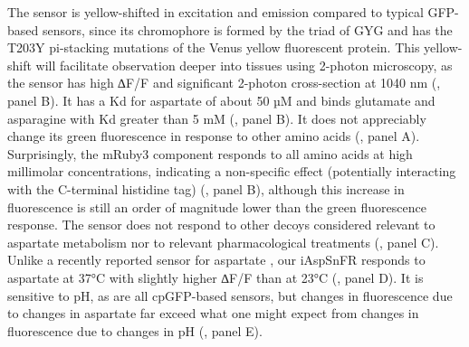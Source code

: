 \documentclass[9pt,lineno]{elife}
\begin{document}
The sensor is yellow-shifted in excitation and emission compared to typical GFP-based sensors, since its chromophore is formed by the triad of GYG and has the T203Y pi-stacking mutations of the Venus yellow fluorescent protein.
This yellow-shift will facilitate observation deeper into tissues using 2-photon microscopy, as the sensor has high ∆F/F and significant 2-photon cross-section at 1040 nm (, panel B).
It has a Kd for aspartate of about 50 µM and binds glutamate and asparagine with Kd greater than 5 mM (, panel B).
It does not appreciably change its green fluorescence in response to other amino acids (, panel A).
Surprisingly, the mRuby3 component responds to all amino acids at high millimolar concentrations, indicating a non-specific effect (potentially interacting with the C-terminal histidine tag) (, panel B), although this increase in fluorescence is still an order of magnitude lower than the green fluorescence response.
The sensor does not respond to other decoys considered relevant to aspartate metabolism nor to relevant pharmacological treatments (, panel C).
Unlike a recently reported sensor for aspartate \citep{Hellweg2023}, our iAspSnFR responds to aspartate at 37°C with slightly higher ∆F/F than at 23°C (, panel D).
It is sensitive to pH, as are all cpGFP-based sensors, but changes in fluorescence due to changes in aspartate far exceed what one might expect from changes in fluorescence due to changes in pH (, panel E).
\end{document}
